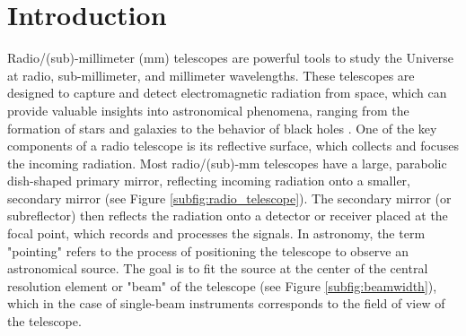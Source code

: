\section{Introduction}
Radio/(sub)-millimeter (mm) telescopes are powerful tools to study the Universe at radio, sub-millimeter, and millimeter wavelengths.
These telescopes are designed to capture and detect electromagnetic radiation from space, which can provide valuable insights into astronomical phenomena,
ranging from the formation of stars \cite{Haarsma2000} and galaxies \cite{Breugel1999} to the behavior of black holes \cite{Coriat2011}.
One of the key components of a radio telescope is its reflective surface, which collects and focuses the incoming radiation.
Most radio/(sub)-mm telescopes have a large, parabolic dish-shaped primary mirror, reflecting incoming radiation onto a smaller, secondary mirror (see Figure \ref{subfig:radio_telescope}).
The secondary mirror (or subreflector) then reflects the radiation onto a detector or receiver placed at the focal point, which records and processes the signals.
In astronomy, the term "pointing" refers to the process of positioning the telescope to observe an astronomical source.
The goal is to fit the source at the center of the central resolution element or "beam" of the telescope (see Figure \ref{subfig:beamwidth}),
which in the case of single-beam instruments corresponds to the field of view of the telescope.\\

